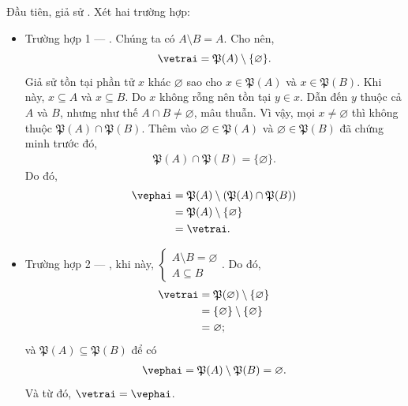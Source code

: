 Đầu tiên, giả sử \coloringCrimson{$\left[\begin{aligned}
      &A \cap B = \varnothing \\
      &A \subseteq B
   \end{aligned}\right.$}. Xét hai trường hợp:
\begin{itemize}
   \item Trường hợp 1 --- . Chúng ta có $A \setminus B = A$. Cho nên, \begin{equation*}
      \vetrai = \mathfrak{P}(A) \setminus \{\varnothing\}.
   \end{equation*}
   Giả sử tồn tại phần tử $x$ khác $\varnothing$ sao cho $x \in \mathfrak{P}(A)$ và $x \in \mathfrak{P}(B)$. Khi này, $x \subseteq A$ và $x \subseteq B$. Do $x$ không rỗng nên tồn tại $y \in x$. Dẫn đến $y$ thuộc cả $A$ và $B$, nhưng như thế $A \cap B \neq \varnothing$, mâu thuẫn. Vì vậy, mọi $x \neq \varnothing$ thì không thuộc $\mathfrak{P}(A) \cap \mathfrak{P}(B)$. Thêm vào $\varnothing \in \mathfrak{P}(A)$ và $\varnothing \in \mathfrak{P}(B)$ đã chứng minh trước đó,
   \begin{align*}
      \mathfrak{P}(A) \cap \mathfrak{P}(B) = \{\varnothing\}. 
   \end{align*}
   Do đó,
   \begin{align*}
      \vephai &= \mathfrak{P}(A) \setminus (\mathfrak{P}(A) \cap \mathfrak{P}(B)) \\
         &= \mathfrak{P}(A) \setminus \{\varnothing\} \\
         &= \vetrai.
   \end{align*}
   \item Trường hợp 2 --- , khi này, $\begin{cases}
      A \setminus B = \varnothing \\
      A \subseteq B 
   \end{cases}$. Do đó, 
   \begin{align*}
      \vetrai &= \mathfrak{P}(\varnothing) \setminus \{\varnothing\} \\
         &= \{\varnothing\} \setminus \{\varnothing\} \\
         &= \varnothing;
   \end{align*} và $\mathfrak{P}(A) \subseteq \mathfrak{P}(B)$ để có
   \begin{align*}
      \vephai = \mathfrak{P}(A) \setminus \mathfrak{P}(B) = \varnothing. 
   \end{align*}
   Và từ đó, $\vetrai = \vephai$.
\end{itemize}

